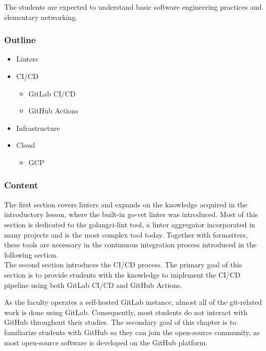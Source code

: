 \documentclass[
  digital,
  color,
  oneside,
  nosansbold,
  nocolorbold,
  lof,
  lot,
]{fithesis4}
\begin{document}
The students are expected to understand basic software engineering practices and elementary networking.

\subsubsection{Outline}

\begin{itemize}
    \item Linters
    \item CI/CD
    \begin{itemize}
        \item GitLab CI/CD
        \item GitHub Actions
    \end{itemize}
    \item Infrastructure
    \item Cloud
    \begin{itemize}
        \item GCP
    \end{itemize}
\end{itemize}

\subsubsection{Content}

The first section covers linters and expands on the knowledge acquired in the introductory lesson, where the built-in go-vet linter was introduced. Most of this section is dedicated to the golangci-lint tool, a linter aggregator incorporated in many projects and is the most complex tool today. Together with formatters, these tools are necessary in the continuous integration process introduced in the following section. \\

The second section introduces the CI/CD process. The primary goal of this section is to provide students with the knowledge to implement the CI/CD pipeline using both GitLab CI/CD and GitHub Actions.

As the faculty operates a self-hosted GitLab instance, almost all of the git-related work is done using GitLab. Consequently, most students do not interact with GitHub throughout their studies. The secondary goal of this chapter is to familiarize students with GitHub so they can join the open-source community, as most open-source software is developed on the GitHub platform. \\
\end{document}
